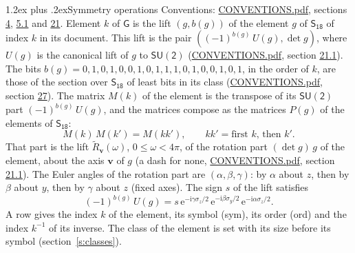 \documentclass[10pt,a4paper]{article}
\makeatletter
\renewcommand\section{\@startsection{section}{1}{\z@}{-3ex plus -1ex minus -.2ex}%
  {1.2ex plus .2ex}{\normalfont\large\sffamily\bfseries\color{parttitle}}}
\numberwithin{equation}{section}
\newcommand{\grp}[1]{\mathsf{#1}}
\newcommand{\vv}{\mathbf{v}}
\newcommand{\iunit}{\mathrm{i}}
\newcommand{\expe}{\mathrm{e}}
\newcommand{\lift}[1]{\tilde{#1}}
\newcommand{\pauli}[1]{\sigma_{#1}}
\makeatother
\begin{document}
\section{Symmetry operations}\label{s:elements}
Conventions: \href{../../CONVENTIONS.pdf}{CONVENTIONS.pdf}, sections \href{../../../rotation/CONVENTIONS.pdf\#conv.4}{4}, \href{../../../rotation/CONVENTIONS.pdf\#conv.5.1}{5.1} and \href{../../CONVENTIONS.pdf\#conv.21}{21}.
\leavevmode\label{n:index.element}\label{n:element.g}\label{n:function.section}Element $k$ of $\grp{G}$ is the lift $(g, b(g))$ of the element $g$ of \href{../../../rotation/data/pdf/S18.pdf}{$\grp{S_{18}}$} of index $k$ in its document. This lift is the pair $((-1)^{b(g)}\,U(g), \det g)$, where $U(g)$ is the canonical lift of $g$ to $\grp{SU(2)}$ (\href{../../CONVENTIONS.pdf}{CONVENTIONS.pdf}, section \href{../../CONVENTIONS.pdf\#conv.21.1}{21.1}). The bits $b(g) = 0, 1, 0, 1, 0, 0, 1, 0, 1, 1, 1, 0, 1, 0, 0, 1, 0, 1$, in the order of $k$, are those of the section over $\grp{S_{18}}$ of least bits in its class (\href{../../CONVENTIONS.pdf}{CONVENTIONS.pdf}, section \href{../../CONVENTIONS.pdf\#conv.27}{27}). \label{n:matrix.element.pin}\label{n:matrix.element}The matrix $M(k)$ of the element is the transpose of its $\grp{SU(2)}$ part $(-1)^{b(g)}\,U(g)$, and the matrices compose as the matrices $P(g)$ of the elements of $\grp{S_{18}}$:
\begin{equation}\label{e:mprod}M(k)\,M(k') = M(kk'),\qquad kk' = \text{first } k\text{, then } k'.\end{equation}
\leavevmode\label{n:angle.omega}\label{n:vector.axis}\label{n:vector.pole}That part is the lift $\lift{R}_{\vv}(\omega)$, $0 \le \omega < 4\pi$, of the rotation part $(\det g)\,g$ of the element, about the axis $\vv$ of $g$ (a dash for none, \href{../../CONVENTIONS.pdf}{CONVENTIONS.pdf}, section \href{../../CONVENTIONS.pdf\#conv.21.1}{21.1}). \label{n:angle.euler.alpha}\label{n:angle.euler.beta}\label{n:angle.euler.gamma}\label{n:vector.coordinates}The Euler angles of the rotation part are $(\alpha,\beta,\gamma)$: by $\alpha$ about $z$, then by $\beta$ about $y$, then by $\gamma$ about $z$ (fixed axes). \label{n:local.euler.sign}The sign $s$ of the lift satisfies
\begin{equation}\label{e:euler}(-1)^{b(g)}\,U(g) = s\,\expe^{-\iunit\gamma\pauli{z}/2}\,\expe^{-\iunit\beta\pauli{y}/2}\,\expe^{-\iunit\alpha\pauli{z}/2}.\end{equation}
\leavevmode\label{n:index.element.inverse}\label{n:head.sym}\label{n:head.ord}A row gives the index $k$ of the element, its symbol (sym), its order (ord) and the index $k^{-1}$ of its inverse. \label{n:head.class}The class of the element is set with its size before its symbol (section~\ref{s:classes}).
\end{document}
